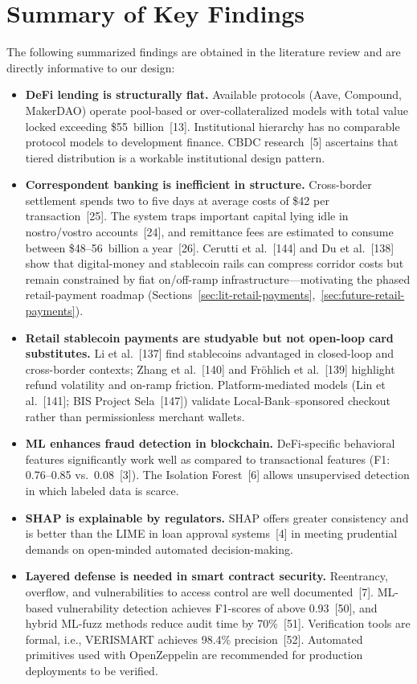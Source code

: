 \documentclass[12pt,a4paper]{report}
\begin{document}
\section{Summary of Key Findings}

The following summarized findings are obtained in the literature review and are directly informative to our design:

\begin{itemize}[noitemsep]
\item \textbf{DeFi lending is structurally flat.} Available protocols (Aave, Compound, MakerDAO) operate pool-based or over-collateralized models with total value locked exceeding \$55~billion~[13]. Institutional hierarchy has no comparable protocol models to development finance. CBDC research~[5] ascertains that tiered distribution is a workable institutional design pattern.
\item \textbf{Correspondent banking is inefficient in structure.} Cross-border settlement spends two to five days at average costs of \$42 per transaction~[25]. The system traps important capital lying idle in nostro/vostro accounts~[24], and remittance fees are estimated to consume between \$48--56~billion a year~[26]. Cerutti et al.~[144] and Du et al.~[138] show that digital-money and stablecoin rails can compress corridor costs but remain constrained by fiat on/off-ramp infrastructure---motivating the phased retail-payment roadmap (Sections~\ref{sec:lit-retail-payments},~\ref{sec:future-retail-payments}).
\item \textbf{Retail stablecoin payments are studyable but not open-loop card substitutes.} Li et al.~[137] find stablecoins advantaged in closed-loop and cross-border contexts; Zhang et al.~[140] and Fr\"{o}hlich et al.~[139] highlight refund volatility and on-ramp friction. Platform-mediated models (Lin et al.~[141]; BIS Project Sela~[147]) validate Local-Bank--sponsored checkout rather than permissionless merchant wallets.
\item \textbf{ML enhances fraud detection in blockchain.} DeFi-specific behavioral features significantly work well as compared to transactional features (F1: 0.76--0.85 vs.\ 0.08~[3]). The Isolation Forest~[6] allows unsupervised detection in which labeled data is scarce.
\item \textbf{SHAP is explainable by regulators.} SHAP offers greater consistency and is better than the LIME in loan approval systems~[4] in meeting prudential demands on open-minded automated decision-making.
\item \textbf{Layered defense is needed in smart contract security.} Reentrancy, overflow, and vulnerabilities to access control are well documented~[7]. ML-based vulnerability detection achieves F1-scores of above 0.93~[50], and hybrid ML-fuzz methods reduce audit time by 70\%~[51]. Verification tools are formal, i.e., VERISMART achieves 98.4\% precision~[52]. Automated primitives used with OpenZeppelin are recommended for production deployments to be verified.

\end{itemize}
\end{document}
